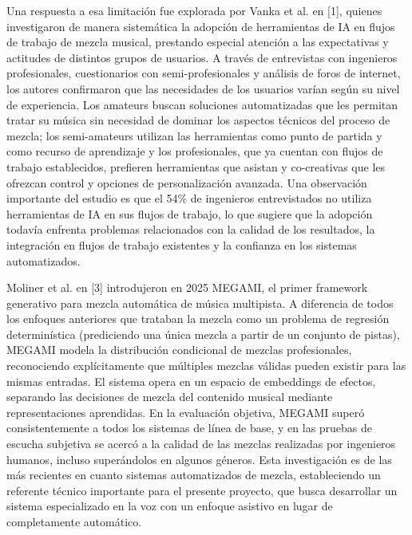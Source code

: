 \documentclass[12pt]{article}
\begin{document}
Una respuesta a esa limitación fue explorada por Vanka et al. en [1], quienes investigaron de manera sistemática la adopción de herramientas de IA en flujos de trabajo de mezcla musical, prestando especial atención a las expectativas y actitudes de distintos grupos de usuarios. A través de entrevistas con ingenieros profesionales, cuestionarios con semi-profesionales y análisis de foros de internet, los autores confirmaron que las necesidades de los usuarios varían según su nivel de experiencia. Los amateurs buscan soluciones automatizadas que les permitan tratar su música sin necesidad de dominar los aspectos técnicos del proceso de mezcla; los semi-amateurs utilizan las herramientas como punto de partida y como recurso de aprendizaje y los profesionales, que ya cuentan con flujos de trabajo establecidos, prefieren herramientas que asistan y co-creativas que les ofrezcan control y opciones de personalización avanzada. Una observación importante del estudio es que el 54\% de ingenieros entrevistados no utiliza herramientas de IA en sus flujos de trabajo, lo que sugiere que la adopción todavía enfrenta problemas relacionados con la calidad de los resultados, la integración en flujos de trabajo existentes y la confianza en los sistemas automatizados.

Moliner et al. en [3] introdujeron en 2025 MEGAMI, el primer framework generativo para mezcla automática de música multipista. A diferencia de todos los enfoques anteriores que trataban la mezcla como un problema de regresión determinística (prediciendo una única mezcla a partir de un conjunto de pistas), MEGAMI modela la distribución condicional de mezclas profesionales, reconociendo explícitamente que múltiples mezclas válidas pueden existir para las mismas entradas. El sistema opera en un espacio de embeddings de efectos, separando las decisiones de mezcla del contenido musical mediante representaciones aprendidas. En la evaluación objetiva, MEGAMI superó consistentemente a todos los sistemas de línea de base, y en las pruebas de escucha subjetiva se acercó a la calidad de las mezclas realizadas por ingenieros humanos, incluso superándolos en algunos géneros. Esta investigación es de las más recientes en cuanto sistemas automatizados de mezcla, estableciendo un referente técnico importante para el presente proyecto, que busca desarrollar un sistema especializado en la voz con un enfoque asistivo en lugar de completamente automático.
\end{document}
